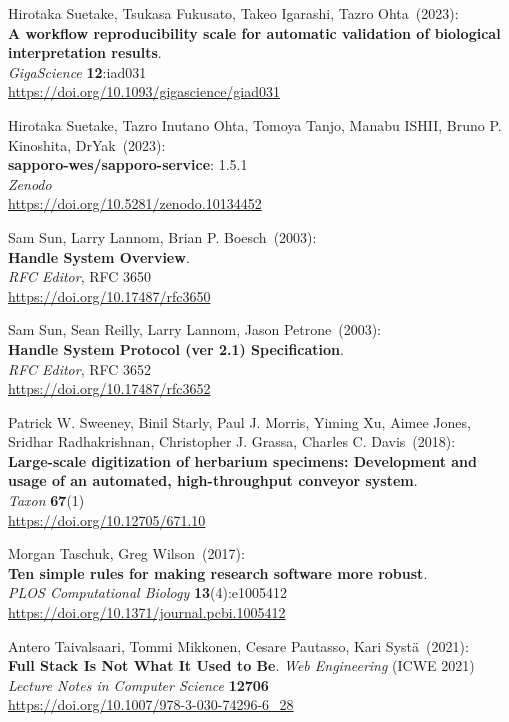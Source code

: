 \begin{thebibliography}{9}
Hirotaka Suetake, Tsukasa Fukusato, Takeo Igarashi, Tazro Ohta~(2023): \\
\textbf{A workflow reproducibility scale for automatic validation of biological interpretation results}.\\
\emph{GigaScience} \textbf{12}:iad031\\
\url{https://doi.org/10.1093/gigascience/giad031}

Hirotaka Suetake, Tazro Inutano Ohta, Tomoya Tanjo, Manabu ISHII, Bruno P. Kinoshita, DrYak~(2023): \\
\textbf{sapporo-wes/sapporo-service}: 1.5.1\\
\emph{Zenodo}\\
\url{https://doi.org/10.5281/zenodo.10134452}


Sam Sun, Larry Lannom, Brian P. Boesch~(2003): \\
\textbf{Handle System Overview}.\\
\emph{RFC Editor}, RFC 3650\\
\url{https://doi.org/10.17487/rfc3650}

Sam Sun, Sean Reilly, Larry Lannom, Jason Petrone~(2003): \\
\textbf{Handle System Protocol (ver 2.1) Specification}.\\
\emph{RFC Editor}, RFC 3652\\
\url{https://doi.org/10.17487/rfc3652}

Patrick W. Sweeney, Binil Starly, Paul J. Morris, Yiming Xu, Aimee Jones, Sridhar Radhakrishnan, Christopher J. Grassa, Charles C. Davis~(2018): \\
\textbf{Large-scale digitization of herbarium specimens: Development and usage of an automated, high-throughput conveyor system}.\\
\emph{Taxon} \textbf{67}(1)\\
\url{https://doi.org/10.12705/671.10}

Morgan Taschuk, Greg Wilson~(2017):\\
\textbf{Ten simple rules for making research software more robust}.\\
\emph{PLOS Computational Biology} \textbf{13}(4):e1005412\\
\url{https://doi.org/10.1371/journal.pcbi.1005412}

Antero Taivalsaari, Tommi Mikkonen, Cesare Pautasso, Kari Systä~(2021): \\
\textbf{Full Stack Is Not What It Used to Be}.
\emph{Web Engineering} (ICWE 2021)\\
\emph{Lecture Notes in Computer Science} \textbf{12706} \\
\url{https://doi.org/10.1007/978-3-030-74296-6_28}


\end{thebibliography}
